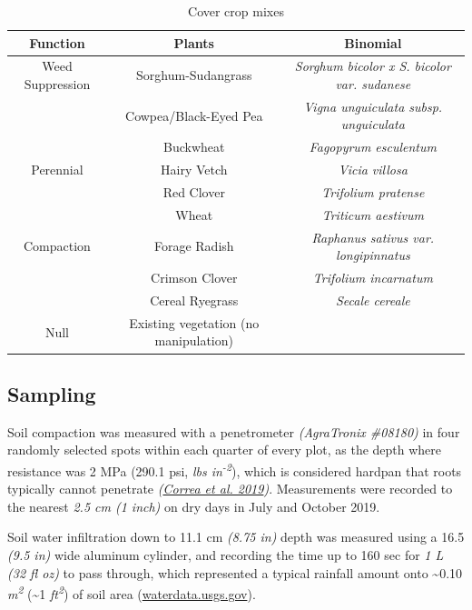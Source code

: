 \documentclass[
  12pt,
]{article}
\begin{document}
\begin{table}

\caption{\label{tab:crops}Cover crop mixes}
\centering
\begin{tabular}[t]{c|c|>{}c}
\hline
Function & Plants & Binomial\\
\hline
Weed Suppression & Sorghum-Sudangrass & \em{Sorghum bicolor x S. bicolor var. sudanese}\\
\cline{1-3}
 & Cowpea/Black-Eyed Pea & \em{Vigna unguiculata subsp. unguiculata}\\
\cline{2-3}
\multirow{-2}{*}{\centering\arraybackslash } & Buckwheat & \em{Fagopyrum esculentum}\\
\cline{1-3}
Perennial & Hairy Vetch & \em{Vicia villosa}\\
\cline{1-3}
 & Red Clover & \em{Trifolium pratense}\\
\cline{2-3}
\multirow{-2}{*}{\centering\arraybackslash } & Wheat & \em{Triticum aestivum}\\
\cline{1-3}
Compaction & Forage Radish & \em{Raphanus sativus var. longipinnatus}\\
\cline{1-3}
 & Crimson Clover & \em{Trifolium incarnatum}\\
\cline{2-3}
\multirow{-2}{*}{\centering\arraybackslash } & Cereal Ryegrass & \em{Secale cereale}\\
\cline{1-3}
Null & Existing vegetation (no manipulation) & \em{}\\
\hline
\end{tabular}
\end{table}

\hypertarget{sampling}{%
\subsection{Sampling}\label{sampling}}

Soil compaction was measured with a penetrometer \emph{(AgraTronix \#08180)} in four randomly selected spots within each quarter of every plot, as the depth where resistance was 2 MPa (290.1 psi, \emph{lbs in\textsuperscript{-2}}), which is considered hardpan that roots typically cannot penetrate \emph{(\protect\hyperlink{ref-correa19}{Correa et al. 2019})}.
Measurements were recorded to the nearest \emph{2.5 cm (1 inch)} on dry days in July and October 2019.

Soil water infiltration down to 11.1 cm \emph{(8.75 in)} depth was measured using a 16.5 \emph{(9.5 in)} wide aluminum cylinder, and recording the time up to 160 sec for \emph{1 L (32 fl oz)} to pass through, which represented a typical rainfall amount onto \textasciitilde0.10 \emph{m\textsuperscript{2}} (\textasciitilde1 \emph{ft\textsuperscript{2}}) of soil area (\url{waterdata.usgs.gov}).
\end{document}
